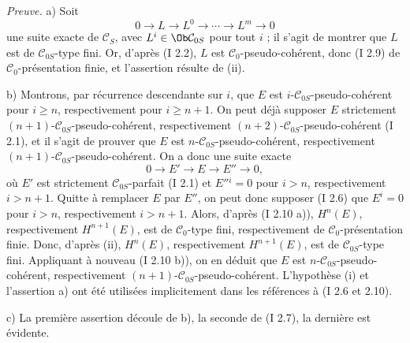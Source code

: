 \documentclass[11pt]{article}
\begin{document}
\emph{Preuve.} a) Soit
\[
0\longrightarrow L\longrightarrow L^0\longrightarrow\cdots\longrightarrow L^m\longrightarrow0
\]
une suite exacte de $\mathcal C_S$, avec $L^i\in\Ob\mathcal C_{0S}$ pour tout $i$ ; il s'agit de montrer que $L$ est de $\mathcal C_{0S}$-type fini. Or, d'après (I 2.2), $L$ est $\mathcal C_0$-pseudo-cohérent, donc (I 2.9) de $\mathcal C_0$-présentation finie, et l'assertion résulte de (ii).

b) Montrons, par récurrence descendante sur $i$, que $E$ est $i$-$\mathcal C_{0S}$-pseudo-cohérent pour $i\ge n$, respectivement pour $i\ge n+1$. On peut déjà supposer $E$ strictement $(n+1)$-$\mathcal C_{0S}$-pseudo-cohérent, respectivement $(n+2)$-$\mathcal C_{0S}$-pseudo-cohérent (I 2.1), et il s'agit de prouver que $E$ est $n$-$\mathcal C_{0S}$-pseudo-cohérent, respectivement $(n+1)$-$\mathcal C_{0S}$-pseudo-cohérent. On a donc une suite exacte
\[
0\longrightarrow E'\longrightarrow E\longrightarrow E''\longrightarrow0,
\]
où $E'$ est strictement $\mathcal C_{0S}$-parfait (I 2.1) et $E''{}^i=0$ pour $i>n$, respectivement $i>n+1$. Quitte à remplacer $E$ par $E''$, on peut donc supposer (I 2.6) que $E^i=0$ pour $i>n$, respectivement $i>n+1$. Alors, d'après (I 2.10 a)), $H^n(E)$, respectivement $H^{n+1}(E)$, est de $\mathcal C_0$-type fini, respectivement de $\mathcal C_0$-présentation finie. Donc, d'après (ii), $H^n(E)$, respectivement $H^{n+1}(E)$, est de $\mathcal C_{0S}$-type fini. Appliquant à nouveau (I 2.10 b)), on en déduit que $E$ est $n$-$\mathcal C_{0S}$-pseudo-cohérent, respectivement $(n+1)$-$\mathcal C_{0S}$-pseudo-cohérent. L'hypothèse (i) et l'assertion a) ont été utilisées implicitement dans les références à (I 2.6 et 2.10).

c) La première assertion découle de b), la seconde de (I 2.7), la dernière est évidente.
\end{document}
